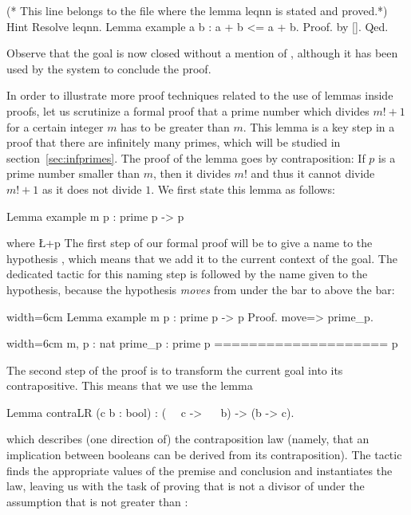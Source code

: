 \begin{coq}{}{}
(* This line belongs to the file where the lemma leqnn is stated and proved.*)
Hint Resolve leqnn.
Lemma example a b : a + b <= a + b.
Proof.  by [].  Qed.
\end{coq}
Observe that the goal is now closed without a mention of ,
although it has been used by the system to conclude the proof.

In order to illustrate more proof techniques related to the use of
lemmas inside proofs, let us scrutinize a formal proof that a prime
number which divides $m! + 1$ for a certain integer $m$ has to be
greater than $m$. This lemma is a key step in a proof that there are
infinitely many primes, which will be studied in
section~\ref{sec:infprimes}. The proof of the lemma goes by
contraposition: If $p$ is a prime number smaller than $m$, then it
divides $m!$ and thus it cannot divide $m! + 1$ as it does not divide
$1$. We first state this lemma as follows:

\begin{coq}{}{}
Lemma example m p : prime p -> p %
\end{coq}
where \L+p %
The first step of our formal proof will be to give a name to the
hypothesis , which means that we add it to the
current context of the goal. The dedicated tactic for this naming step is
 followed by the name given to the hypothesis, because the
hypothesis \emph{moves} from under the bar to above the bar:

\begin{coq}{}{width=6cm}
Lemma example m p : prime p ->
  p %
Proof.
move=> prime_p.
\end{coq}
\begin{coqout}{}{width=6cm}
m, p : nat
prime_p : prime p
====================
p %
\end{coqout}
The second step of the proof is to transform the current goal into its
contrapositive. This means that we use the lemma

\begin{coq}{}{}
Lemma contraLR (c b : bool) :  (~~ c -> ~~ b) -> (b -> c).
\end{coq}

which describes (one direction of) the contraposition law (namely,
that an implication between booleans can be derived from its
contraposition). The  tactic
finds the appropriate values of the premise and conclusion and
instantiates the law, leaving us with the task of proving
that  is not a
divisor of  under the assumption that  is not
greater than :

